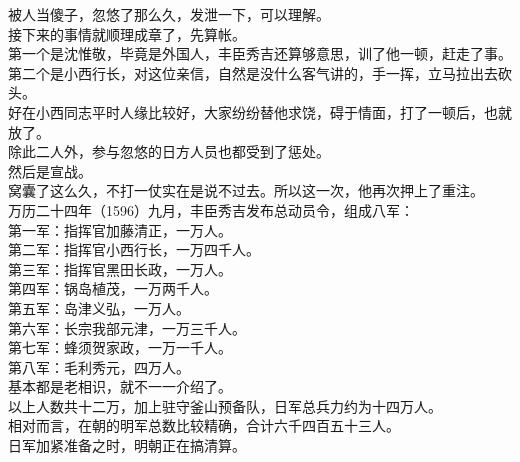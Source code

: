 \begin{multicols}{\theparacolNo}
被人当傻子，忽悠了那么久，发泄一下，可以理解。\\

接下来的事情就顺理成章了，先算帐。\\

第一个是沈惟敬，毕竟是外国人，丰臣秀吉还算够意思，训了他一顿，赶走了事。\\

第二个是小西行长，对这位亲信，自然是没什么客气讲的，手一挥，立马拉出去砍头。\\

好在小西同志平时人缘比较好，大家纷纷替他求饶，碍于情面，打了一顿后，也就放了。\\

除此二人外，参与忽悠的日方人员也都受到了惩处。\\

然后是宣战。\\

窝囊了这么久，不打一仗实在是说不过去。所以这一次，他再次押上了重注。\\

万历二十四年（1596）九月，丰臣秀吉发布总动员令，组成八军：\\

第一军：指挥官加藤清正，一万人。\\

第二军：指挥官小西行长，一万四千人。\\

第三军：指挥官黑田长政，一万人。\\

第四军：锅岛植茂，一万两千人。\\

第五军：岛津义弘，一万人。\\

第六军：长宗我部元津，一万三千人。\\

第七军：蜂须贺家政，一万一千人。\\

第八军：毛利秀元，四万人。\\

基本都是老相识，就不一一介绍了。\\

以上人数共十二万，加上驻守釜山预备队，日军总兵力约为十四万人。\\

相对而言，在朝的明军总数比较精确，合计六千四百五十三人。\\

日军加紧准备之时，明朝正在搞清算。\\


\end{multicols}
